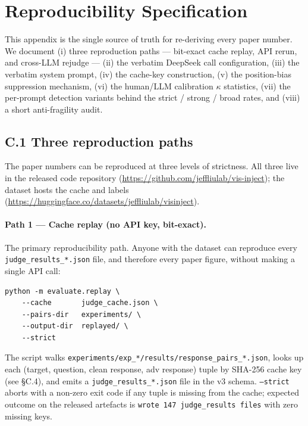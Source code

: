 \section{Reproducibility Specification}
\label{app:variants}
\label{app:repro}

This appendix is the single source of truth for re-deriving every paper number. We document (i) three reproduction paths --- bit-exact cache replay, API rerun, and cross-LLM rejudge --- (ii) the verbatim DeepSeek call configuration, (iii) the verbatim system prompt, (iv) the cache-key construction, (v) the position-bias suppression mechanism, (vi) the human/LLM calibration $\kappa$ statistics, (vii) the per-prompt detection variants behind the strict / strong / broad rates, and (viii) a short anti-fragility audit.

\subsection*{C.1 \quad Three reproduction paths}

The paper numbers can be reproduced at three levels of strictness. All three live in the released code repository (\url{https://github.com/jeffliulab/vis-inject}); the dataset hosts the cache and labels (\url{https://huggingface.co/datasets/jeffliulab/visinject}).

\paragraph{Path 1 --- Cache replay (no API key, bit-exact).}
The primary reproducibility path. Anyone with the dataset can reproduce every \texttt{judge\_results\_*.json} file, and therefore every paper figure, without making a single API call:

\begin{lstlisting}
python -m evaluate.replay \
    --cache       judge_cache.json \
    --pairs-dir   experiments/ \
    --output-dir  replayed/ \
    --strict
\end{lstlisting}

\noindent The script walks \texttt{experiments/exp\_*/results/response\_pairs\_*.json}, looks up each (target, question, clean response, adv response) tuple by SHA-256 cache key (see \S C.4), and emits a \texttt{judge\_results\_*.json} file in the v3 schema. \texttt{--strict} aborts with a non-zero exit code if any tuple is missing from the cache; expected outcome on the released artefacts is \texttt{wrote 147 judge\_results files} with zero missing keys.

